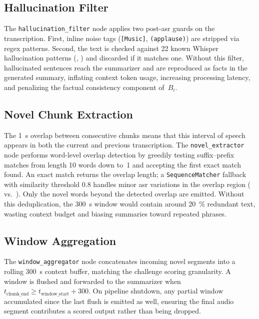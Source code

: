 \documentclass[conference,letterpaper]{IEEEtran}
\begin{document}
\subsection{Hallucination Filter}
\label{sec:arch:halluc}

The \texttt{hallucination\_filter} node applies two post-\gls{asr} guards on the transcription.
First, inline noise tags (\eg \texttt{[Music]}, \texttt{(applause)}) are stripped via regex patterns.
Second, the text is checked against \num{22} known Whisper hallucination patterns (\eg {}, ) and discarded if it matches one.
Without this filter, hallucinated sentences reach the summarizer and are reproduced as facts in the generated summary, inflating context token usage, increasing processing latency, and penalizing the factual consistency component of~$B_i$.

\subsection{Novel Chunk Extraction}
\label{sec:arch:novel}

The \SI{1}{\second} overlap between consecutive chunks means that this interval of speech appears in both the current and previous transcription.
The \texttt{novel\_extractor} node performs word-level overlap detection by greedily testing suffix–prefix matches from length \num{10} words down to~\num{1} and accepting the first exact match found.
An exact match returns the overlap length; a \texttt{SequenceMatcher} fallback with similarity threshold \num{0.8} handles minor \gls{asr} variations in the overlap region (\eg {} vs.\ ).
Only the novel words beyond the detected overlap are emitted.
Without this deduplication, the \SI{300}{\second} window would contain around \SI{20}{\percent} redundant text, wasting context budget and biasing summaries toward repeated phrases.

\subsection{Window Aggregation}
\label{sec:arch:window}

The \texttt{window\_aggregator} node concatenates incoming novel segments into a rolling \SI{300}{\second} context buffer, matching the challenge scoring granularity.
A window is flushed and forwarded to the summarizer when $t_{\text{chunk\_end}} \ge t_{\text{window\_start}} + 300$.
On pipeline shutdown, any partial window accumulated since the last flush is emitted as well, ensuring the final audio segment contributes a scored output rather than being dropped.
\end{document}
